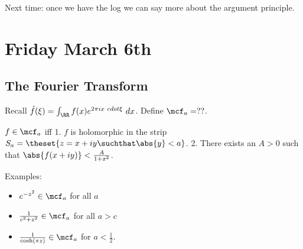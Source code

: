 Next time: once we have the log we can say more about the argument
principle.

\hypertarget{friday-march-6th}{%
\section{Friday March 6th}\label{friday-march-6th}}

\hypertarget{the-fourier-transform}{%
\subsection{The Fourier Transform}\label{the-fourier-transform}}

Recall \(\hat f(\xi) = \int_\RR f(x) e^{2\pi i x\ cdot \xi} ~dx\).
Define \(\mcf_a = ??\).

\begin{description}
\tightlist
\item[Definition (Decay)]
\(f\in \mcf_a\) iff 1. \(f\) is holomorphic in the strip
\(S_a = \theset{z = x + iy \suchthat \abs{y} < a}\). 2. There exists an
\(A>0\) such that \(\abs{f(x + iy)} < \frac{A}{1+x^2}\).
\end{description}

Examples:

\begin{itemize}
\tightlist
\item
  \(e^{-z^2} \in \mcf_a\) for all \(a\)
\item
  \(\frac{1}{c^2 + z^2} \in \mcf_a\) for all \(a > c\)
\item
  \(\frac {1}{\cosh(\pi z)} \in \mcf_a\) for \(a< \frac 1 2\).
\end{itemize}

